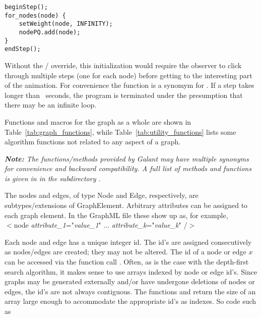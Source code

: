\begin{center}
\begin{minipage}{0.5\textwidth}
\begin{verbatim}
beginStep();
for_nodes(node) {
    setWeight(node, INFINITY);
    nodePQ.add(node);
}
endStep();
\end{verbatim}
\end{minipage}
\end{center}

Without the /
override, this initialization would require the observer to click
through multiple steps (one for each node) before getting to the interesting
part of the animation.
For convenience the function  is a synomym for .
If a step takes longer than \Timeout\ seconds, the program is terminated
under the presumption that there may be an infinite loop.





Functions and macros for the graph as a whole are shown in Table~\ref{tab:graph_functions}, while Table~\ref{tab:utility_functions} lists some algorithm functions not related to any aspect of a graph.

\emph{\textbf{Note:} The functions/methods provided by Galant may have multiple synonyms for
convenience and backward compatibility. A full list of methods and functions
is given in  in the subdirectory
.}

The nodes and edges, of type \textsf{Node} and \textsf{Edge}, respectively,
are subtypes/extensions of \textsf{GraphElement}.
Arbitrary attributes can be assigned to each graph element. In the GraphML file
these show up as, for example,\\
\hspace*{3em}
\textsf{
$<$node \emph{attribute\_1}="\emph{value\_1}" ... \emph{attribute\_k}="\emph{value\_k}" /$>$
}

Each node and edge has a unique integer id.
The id's are assigned consecutively as nodes/edges are created;
they may not be altered.
The id of a node or edge $x$ can be accessed via the function call .
Often, as is the case with the depth-first search algorithm, it makes sense to use
arrays indexed by node or edge id's.
Since graphs may be generated externally and/or have undergone deletions of nodes or
edges, the id's are not always contiguous.
The functions  and  return the size of an array
large enough to accommodate the appropriate id's as indexes. So code such as

